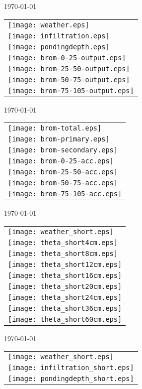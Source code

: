 \documentclass[a4paper]{article}
\begin{document}
\newpage
\today \\
%
\begin{tabular}{l}
\texttt{[image: weather.eps]} \\
\texttt{[image: infiltration.eps]}\\
\texttt{[image: pondingdepth.eps]}\\
\texttt{[image: brom-0-25-output.eps]} \\
\texttt{[image: brom-25-50-output.eps]} \\
\texttt{[image: brom-50-75-output.eps]} \\
\texttt{[image: brom-75-105-output.eps]}
\end{tabular}

\newpage
\today \\
%
\begin{tabular}{l}
\texttt{[image: brom-total.eps]} \\
\texttt{[image: brom-primary.eps]} \\
\texttt{[image: brom-secondary.eps]} \\
\texttt{[image: brom-0-25-acc.eps]} \\
\texttt{[image: brom-25-50-acc.eps]} \\
\texttt{[image: brom-50-75-acc.eps]} \\
\texttt{[image: brom-75-105-acc.eps]}
\end{tabular}

\newpage
\today \\
%
\begin{tabular}{l}
\texttt{[image: weather\_short.eps]} \\
\texttt{[image: theta\_short4cm.eps]} \\
\texttt{[image: theta\_short8cm.eps]} \\
\texttt{[image: theta\_short12cm.eps]} \\
\texttt{[image: theta\_short16cm.eps]} \\
\texttt{[image: theta\_short20cm.eps]} \\
\texttt{[image: theta\_short24cm.eps]} \\
\texttt{[image: theta\_short36cm.eps]} \\
\texttt{[image: theta\_short60cm.eps]}
\end{tabular}

\newpage
\today \\
%
\begin{tabular}{l}
\texttt{[image: weather\_short.eps]} \\
\texttt{[image: infiltration\_short.eps]} \\
\texttt{[image: pondingdepth\_short.eps]}
\end{tabular}
\end{document}
